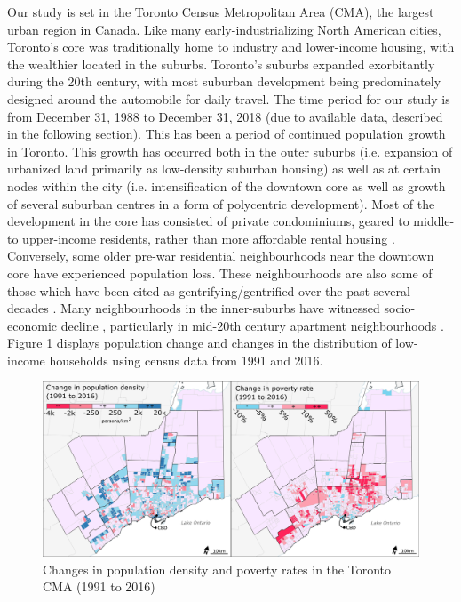 Our study is set in the Toronto Census Metropolitan Area (CMA), the largest urban region in Canada. Like many early-industrializing North American cities, Toronto's core was traditionally home to industry and lower-income housing, with the wealthier located in the suburbs. Toronto's suburbs expanded exorbitantly during the 20th century, with most suburban development being predominately designed around the automobile for daily travel. The time period for our study is from December 31, 1988 to December 31, 2018 (due to available data, described in the following section). This has been a period of continued population growth in Toronto. This growth has occurred both in the outer suburbs (i.e. expansion of urbanized land primarily as low-density suburban housing) as well as at certain nodes within the city (i.e. intensification of the downtown core as well as growth of several suburban centres in a form of polycentric development). Most of the development in the core has consisted of private condominiums, geared to middle- to upper-income residents, rather than more affordable rental housing \cite{rosen_castles_2015,walks_gentrification_2021}. Conversely, some older pre-war residential neighbourhoods near the downtown core have experienced population loss. These neighbourhoods are also some of those which have been cited as gentrifying/gentrified over the past several decades \cite{hulchanski_three_2010}. Many neighbourhoods in the inner-suburbs have witnessed socio-economic decline \cite{hulchanski_three_2010}, particularly in mid-20th century apartment neighbourhoods \cite{skaburskis_filtering_2014}. Figure \ref{fig:studyareamap} displays population change and changes in the distribution of low-income households using census data from 1991 and 2016.

\begin{figure}[h]
	\centering
	\includegraphics[width=1\linewidth]{figures/study_area_map.png}
	\caption[]{Changes in population density and poverty rates in the Toronto CMA (1991 to 2016)}
	\label{fig:studyareamap}
\end{figure}



